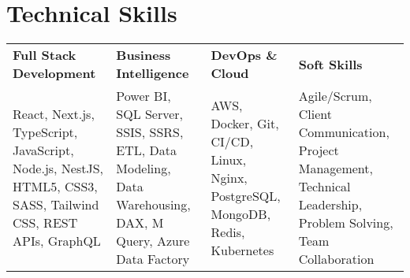 \section{\textbf{Technical Skills}}
\begin{tabular}{llll}
\textbf{Full Stack Development} & \textbf{Business Intelligence} & \textbf{DevOps \& Cloud} & \textbf{Soft Skills} \\
React, Next.js, TypeScript, JavaScript, Node.js, NestJS, HTML5, CSS3, SASS, Tailwind CSS, REST APIs, GraphQL & Power BI, SQL Server, SSIS, SSRS, ETL, Data Modeling, Data Warehousing, DAX, M Query, Azure Data Factory & AWS, Docker, Git, CI/CD, Linux, Nginx, PostgreSQL, MongoDB, Redis, Kubernetes & Agile/Scrum, Client Communication, Project Management, Technical Leadership, Problem Solving, Team Collaboration \\
\end{tabular}
\vspace{\skillsEndSpacing}